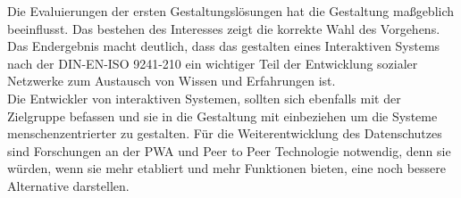 Die Evaluierungen der ersten Gestaltungslösungen hat die Gestaltung maßgeblich beeinflusst. Das bestehen des Interesses zeigt die korrekte Wahl des Vorgehens.\\
Das Endergebnis macht deutlich, dass das gestalten eines Interaktiven Systems nach der DIN-EN-ISO 9241-210 ein wichtiger Teil der Entwicklung sozialer Netzwerke zum Austausch von Wissen und Erfahrungen ist. \\
Die Entwickler von interaktiven Systemen, sollten sich ebenfalls mit der Zielgruppe befassen und sie in die Gestaltung mit einbeziehen um die Systeme menschenzentrierter zu gestalten. Für die Weiterentwicklung des Datenschutzes sind Forschungen an der PWA und Peer to Peer Technologie notwendig, denn sie würden, wenn sie mehr etabliert und mehr Funktionen bieten, eine noch bessere Alternative darstellen.
\newpage
